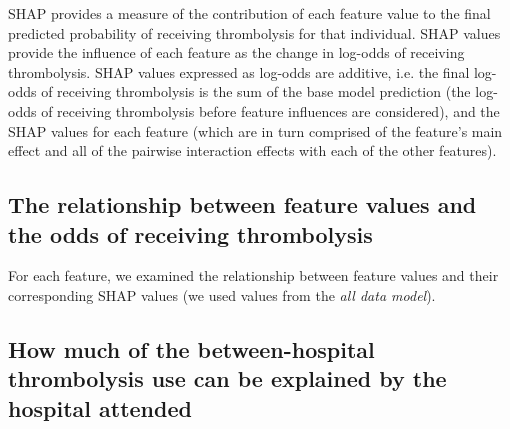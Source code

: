 
SHAP provides a measure of the contribution of each feature value to the final predicted probability of receiving thrombolysis for that individual. SHAP values provide the influence of each feature as the change in log-odds of receiving thrombolysis. SHAP values expressed as log-odds are additive, i.e. the final log-odds of receiving thrombolysis is the sum of the base model prediction (the log-odds of receiving thrombolysis before feature influences are considered), and the SHAP values for each feature (which are in turn comprised of the feature's main effect and all of the pairwise interaction effects with each of the other features). 


\subsection{The relationship between feature values and the odds of receiving thrombolysis}
For each feature, we examined the relationship between feature values and their corresponding SHAP values (we used values from the \emph{all data model}).

\subsection{How much of the between-hospital thrombolysis use can be explained by the hospital attended}%

